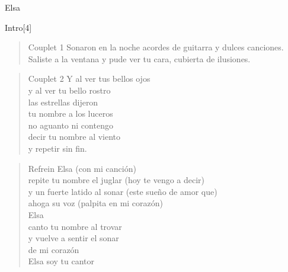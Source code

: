 \begin{song}[tango]{Elsa}
\begin{instrumental}{Intro}[4]
 \measure{}  \measure{}
 \measure{}  \measure{}
 \measure{}  \measure{}
 \measure{} 
\end{instrumental}

\begin{verse}{Couplet 1}
Sonaron en la noche 
acordes de guitarra 
y dulces canciones.\\
Saliste a la ventana 
y pude ver tu cara, 
cubierta de ilusiones.
\end{verse}

\begin{verse}{Couplet 2}
Y al ver tus bellos ojos\\
y al ver tu bello rostro\\
las estrellas dijeron \\
tu nombre a los luceros\\
no aguanto ni contengo\\
decir tu nombre al viento\\
y repetir sin fin.
\end{verse}


\begin{verse}{Refrein}
Elsa   (con mi canción)\\
repite tu nombre el juglar  (hoy te vengo a decir)\\
y un fuerte latido al sonar  (este sueño de amor que)\\
ahoga su voz   (palpita en mi corazón)\\
  
Elsa\\
canto tu nombre al trovar\\
y vuelve a sentir el sonar\\
de mi corazón\\

Elsa soy tu cantor
\end{verse}

\clearpage
\begin{translation}

\end{translation}
\end{song}
